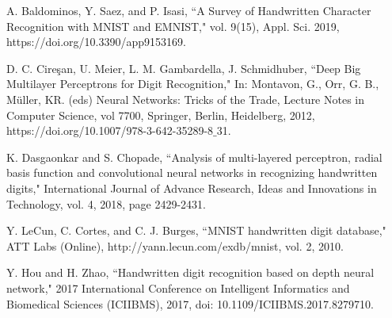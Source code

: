 \documentclass[11pt]{amsart}
\begin{document}

\begin{thebibliography}{10}
A. Baldominos, Y. Saez, and P. Isasi, ``A Survey of Handwritten Character Recognition with MNIST and EMNIST," vol. 9(15), Appl. Sci. 2019,  https://doi.org/10.3390/app9153169.

D. C. Cire\c{s}an, U. Meier, L. M. Gambardella, J. Schmidhuber, ``Deep Big Multilayer Perceptrons for Digit Recognition," In: Montavon, G., Orr, G. B., M\"{u}ller, KR. (eds) Neural Networks: Tricks of the Trade, Lecture Notes in Computer Science, vol 7700, Springer, Berlin, Heidelberg, 2012, https://doi.org/10.1007/978-3-642-35289-8$\_$31.

K. Dasgaonkar and S. Chopade, ``Analysis of multi-layered perceptron, radial basis function and convolutional neural networks in recognizing handwritten digits," International Journal of Advance Research, Ideas and Innovations in Technology, vol. 4, 2018, page 2429-2431.

Y. LeCun, C. Cortes, and C. J. Burges, ``MNIST handwritten digit database," ATT Labs (Online), http://yann.lecun.com/exdb/mnist, vol. 2, 2010.







Y. Hou and H. Zhao, ``Handwritten digit recognition based on depth neural network," 2017 International Conference on Intelligent Informatics and Biomedical Sciences (ICIIBMS), 2017, doi: 10.1109/ICIIBMS.2017.8279710.

\end{thebibliography}
\end{document}
